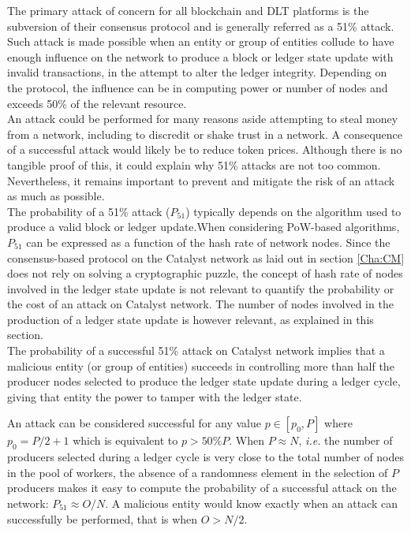 The primary attack of concern for all blockchain and DLT platforms is the subversion of their consensus protocol and is generally referred as a 51\% attack. Such attack is made possible when an entity or group of entities collude to have enough influence on the network to produce a block or ledger state update with invalid transactions, in the attempt to alter the ledger integrity. Depending on the protocol, the influence can be in computing power or number of nodes and exceeds 50\% of the relevant resource.  \\

An attack could be performed for many reasons aside attempting to steal money from a network, including to discredit or shake trust in a network. A consequence of a successful attack would likely be to reduce token prices. Although there is no tangible proof of this, it could explain why 51\% attacks are not too common. Nevertheless, it remains important to prevent and mitigate the risk of an attack as much as possible.\\

The probability of a 51\% attack ($P_{51}$) typically depends on the algorithm used to produce a valid block or ledger update.When considering PoW-based algorithms, $P_{51}$ can be expressed as a function of the hash rate of network nodes.  Since the consensus-based protocol on the Catalyst network as laid out in section \ref{Cha:CM} does not rely on solving a cryptographic puzzle, the concept of hash rate of nodes involved in the ledger state update is not relevant to quantify the probability or the cost of an attack on Catalyst network. The number of nodes involved in the production of a ledger state update is however relevant, as explained in this section. \\ 

The probability of a successful 51\% attack on Catalyst network implies that a malicious entity (or group of entities) succeeds in controlling more than half the producer nodes selected to produce the ledger state update during a ledger cycle, giving that entity the power to tamper with the ledger state. 

An attack can be considered successful for any value $p \in [p_0,P]$ where $p_0 = P/2 + 1$ which is equivalent to $p > 50\%P$. When $P \approx N$, \textit{i.e.} the number of producers selected during a ledger cycle is very close to the total number of nodes in the pool of workers, the absence of a randomness element in the selection of $P$ producers  makes it easy to compute the probability of a successful attack on the network: $P_{51} \approx O/N$. A malicious entity would know exactly when an attack can successfully be performed, that is when $O > N/2$. \\

